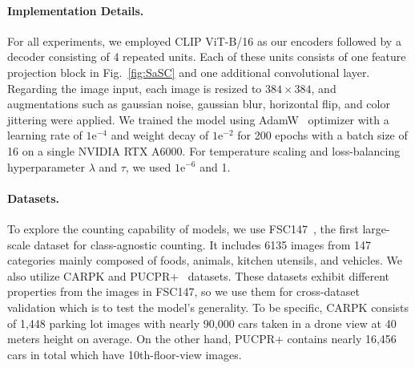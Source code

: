 \paragraph{Implementation Details.}
For all experiments, we employed CLIP ViT-B/16 as our encoders followed by a decoder consisting of 4 repeated units.
Each of these units consists of one feature projection block in Fig.~\ref{fig:SaSC} and one additional convolutional layer.
Regarding the image input, each image is resized to $384\times384$, and augmentations such as gaussian noise, gaussian blur, horizontal flip, and color jittering were applied.
We trained the model using AdamW~\cite{2017adamw} optimizer with a learning rate of $1\mathrm{e}^{-4}$ and weight decay of $1\mathrm{e}^{-2}$ for 200 epochs with a batch size of 16 on a single NVIDIA RTX A6000.
For temperature scaling and loss-balancing hyperparameter $\lambda$ and $\tau$, we used $1\mathrm{e}^{-6}$ and 1.


\paragraph{Datasets.}
To explore the counting capability of models, we use FSC147~\cite{2021FAMNet}, the first large-scale dataset for class-agnostic counting.
It includes 6135 images from 147 categories mainly composed of foods, animals, kitchen utensils, and vehicles.
We also utilize CARPK and PUCPR+~\cite{2017drone} datasets.
These datasets exhibit different properties from the images in FSC147, so we use them for cross-dataset validation which is to test the model's generality.
To be specific, CARPK consists of 1,448 parking lot images with nearly 90,000 cars taken in a drone view at 40 meters height on average.
On the other hand, PUCPR+ contains nearly 16,456 cars in total which have 10th-floor-view images.


